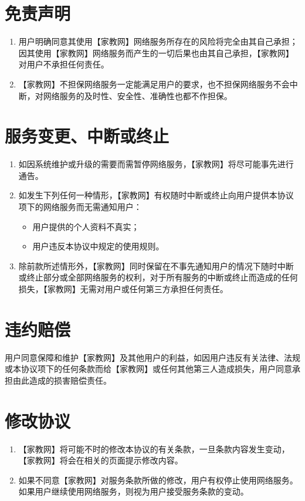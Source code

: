 \documentclass[UTF8]{ctexart}
\newcommand{\proName}{【家教网】}
\begin{document}
    \section{免责声明}
        \begin{enumerate}
            \item 用户明确同意其使用{\proName}网络服务所存在的风险将完全由其自己承担；因其使用{\proName}网络服务而产生的一切后果也由其自己承担，{\proName}对用户不承担任何责任。
            \item {\proName}不担保网络服务一定能满足用户的要求，也不担保网络服务不会中断，对网络服务的及时性、安全性、准确性也都不作担保。
        \end{enumerate}
    \section{服务变更、中断或终止}
        \begin{enumerate}
            \item 如因系统维护或升级的需要而需暂停网络服务，{\proName}将尽可能事先进行通告。
            \item 如发生下列任何一种情形，{\proName}有权随时中断或终止向用户提供本协议项下的网络服务而无需通知用户：
                \begin{itemize}
                    \item 用户提供的个人资料不真实；
                    \item 用户违反本协议中规定的使用规则。
                \end{itemize}
            \item 除前款所述情形外，{\proName}同时保留在不事先通知用户的情况下随时中断或终止部分或全部网络服务的权利，对于所有服务的中断或终止而造成的任何损失，{\proName}无需对用户或任何第三方承担任何责任。
        \end{enumerate}
    \section{违约赔偿}
        用户同意保障和维护{\proName}及其他用户的利益，如因用户违反有关法律、法规或本协议项下的任何条款而给{\proName}或任何其他第三人造成损失，用户同意承担由此造成的损害赔偿责任。
    \section{修改协议}
        \begin{enumerate}
            \item {\proName}将可能不时的修改本协议的有关条款，一旦条款内容发生变动，{\proName}将会在相关的页面提示修改内容。
            \item 如果不同意{\proName}对服务条款所做的修改，用户有权停止使用网络服务。如果用户继续使用网络服务，则视为用户接受服务条款的变动。
        \end{enumerate}
\end{document}
